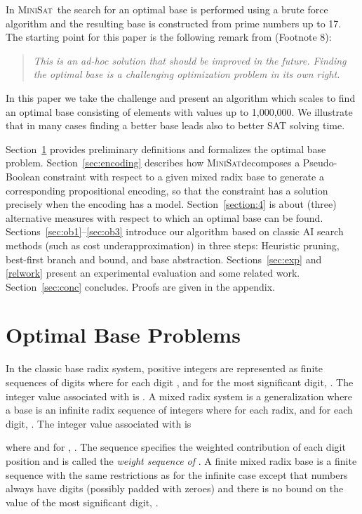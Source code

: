 \documentclass[envcountsame]{llncs}
\newcommand\minisatp{\textsc{MiniSat}}
\begin{document}
In \minisatp\ the search for an optimal base is performed using a
brute force algorithm and the resulting base is constructed from prime
numbers up to 17. The starting point for this paper is the following
remark	 from \cite{EenS06} (Footnote 8):
\vspace{-1mm}
\begin{quotation}\noindent
  \emph{This is an ad-hoc solution that should be improved in the
  future. Finding the optimal base is a challenging optimization
  problem in its own right.}
\end{quotation}
In this paper we take the challenge and present an algorithm which
scales to find an optimal base consisting of elements 
with values up to 1,000,000. We illustrate that in many
cases finding a better base leads also to better SAT solving time.

\pagebreak

Section~\ref{section:obp} provides preliminary definitions and
formalizes the optimal base problem.
Section~\ref{sec:encoding} describes how \minisatp decomposes a
Pseudo-Boolean constraint with respect to a given mixed radix base to
generate a corresponding propositional encoding, so that the constraint has
a solution precisely when the encoding has a model.
Section~\ref{section:4} is about (three) alternative measures with
respect to which an optimal base can be found.
Sections~\ref{sec:ob1}--\ref{sec:ob3} introduce our algorithm
based on classic AI search methods (such as cost underapproximation)
in
three steps: Heuristic pruning, best-first branch and bound, and base
abstraction.  
Sections~\ref{sec:exp} and \ref{relwork} present an experimental
evaluation and some related work.  
Section~\ref{sec:conc} concludes. 
Proofs are given in the appendix.




\section{Optimal Base Problems}
\label{section:obp}

In the classic base  radix system, positive integers are
represented as finite sequences of digits
 where for each digit , and
for the most significant digit, .  The integer value associated
with  is .
A mixed radix system is a generalization where a base is an infinite
radix sequence  of integers where for
each radix,  and for each digit, .
The integer value associated with  is 

where  and for , .
The sequence  specifies the
weighted contribution of each  digit position and is called the
\emph{weight sequence of }.  
A finite mixed radix base is a finite sequence
 with the same restrictions as for
the infinite case except that numbers always have  digits
(possibly padded with zeroes) and there is no bound on the value of
the most significant digit, .
\end{document}

